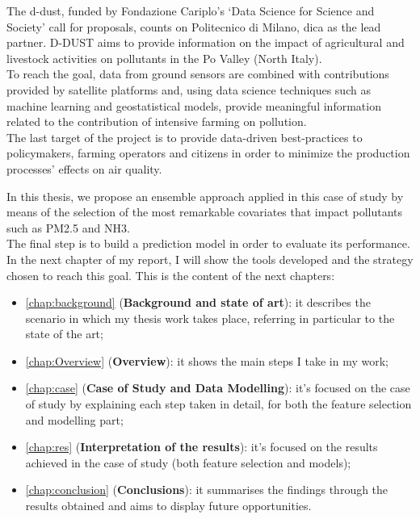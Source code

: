 The \gls{d-dust}, funded by Fondazione Cariplo’s ‘Data Science for Science and Society’ call for proposals, counts on Politecnico di Milano, \gls{dica} as the lead partner.\newline
D-DUST aims to provide information on the impact of agricultural and livestock activities on pollutants in the Po Valley (North Italy).\\ 
To reach the goal, data from ground sensors are combined with contributions provided by satellite platforms and, using data science techniques such as machine learning and geostatistical models, provide meaningful information related to the contribution of intensive farming on pollution.\\




The last target of the project is to provide data-driven best-practices to policymakers, farming operators and citizens in order to minimize the production processes' effects on air quality.\par\par
In this thesis, we propose an ensemble approach applied in this case of study by means of the selection of the most remarkable covariates that impact pollutants such as PM2.5 and NH3. \\
The final step is to build a prediction model in order to evaluate its performance. \\ 
In the next chapter of my report, I will show the tools developed and the strategy chosen to reach this goal. 
This is the content of the next chapters:

\begin{itemize}
  \item \autoref{chap:background} (\textbf{Background and state of art}): it describes the scenario in which my thesis work takes place, referring in particular to the state of the art;
  \item \autoref{chap:Overview} (\textbf{Overview}): it shows the main steps I take in my work;
  \item \autoref{chap:case} (\textbf{Case of Study and Data Modelling}): it's focused on the case of study by explaining each step taken in detail, for both the feature selection and modelling part;
 \item \autoref{chap:res} (\textbf{Interpretation of the results}): it's focused on the results achieved in the case of study (both feature selection and models);
 \item \autoref{chap:conclusion} (\textbf{Conclusions}): it summarises the findings through the results obtained and aims to display future opportunities.  
\end{itemize}


